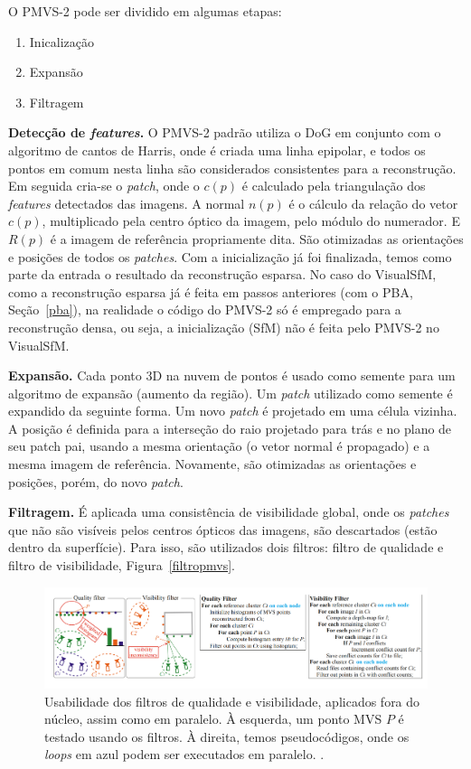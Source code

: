 O PMVS-2 pode ser dividido em algumas etapas:
\begin{enumerate}
\item{Inicalização}
\item{Expansão}
\item{Filtragem}
\end{enumerate}

\noindent\textbf{Detecção de \emph{features}.}
O PMVS-2 padrão utiliza o DoG em conjunto com o algoritmo de cantos de Harris,
onde é criada uma linha epipolar, e todos os pontos em comum nesta linha são
considerados consistentes para a reconstrução.  Em seguida cria-se o
\emph{patch},
onde o $c(p)$ é calculado pela triangulação dos \emph{features} detectados das
imagens. A normal $n(p)$ é o cálculo da relação do vetor $c(p)$, multiplicado
pela centro óptico da imagem, pelo módulo do numerador. E $R(p)$ é a imagem de
referência propriamente dita. São otimizadas as orientações e posições de todos
os \emph{patches}. Com a inicialização já foi finalizada, temos como parte da
entrada o resultado da reconstrução esparsa. No caso do VisualSfM, como a
reconstrução esparsa já é feita em passos anteriores (com o PBA, Seção~\ref{pba}), na
realidade o código do PMVS-2 só é empregado para a reconstrução densa, ou seja, a
inicialização (SfM) não é feita pelo PMVS-2 no VisualSfM.

\noindent\textbf{Expansão.}
Cada ponto 3D na nuvem de pontos é usado como semente para um algoritmo de
expansão (aumento da região). Um \emph{patch} utilizado como semente é expandido
da seguinte forma. Um novo \emph{patch} é projetado em uma célula vizinha.  A
posição é definida para a interseção do raio projetado para trás e no plano de
seu patch pai, usando a mesma orientação (o vetor normal é propagado) e a mesma
imagem de referência.  Novamente, são otimizadas as orientações e posições,
porém, do novo \emph{patch}.	

\noindent\textbf{Filtragem.}
É aplicada uma consistência de visibilidade global, onde os \emph{patches} que
não são visíveis pelos centros ópticos das imagens, são descartados (estão
dentro da superfície). Para isso, são utilizados dois filtros: filtro de
qualidade e filtro de visibilidade, Figura~\ref{filtropmvs}.
\begin{figure}
	\centering
	\includegraphics[width=1\linewidth]{figs/filtropmvs.png}
	\caption{%
  Usabilidade dos filtros de qualidade e visibilidade, aplicados fora
  do núcleo, assim como em paralelo. À esquerda, um ponto MVS $P$ é testado
  usando os filtros. À direita, temos pseudocódigos, onde os \emph{loops}
  em azul podem ser executados em paralelo.
	\protect\cite{furukawa2010towards}.
	}\label{fig:filtropmvs}
\end{figure} 

